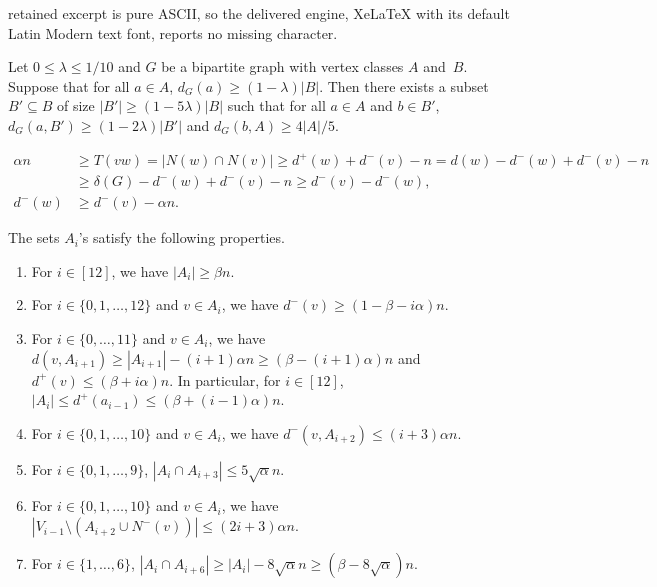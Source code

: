 \documentclass[10pt,a4paper]{amsart}
\begin{document}
retained excerpt is pure ASCII, so the delivered engine, XeLaTeX with its default Latin Modern text font, reports no missing character.
	\begin{proposition}\label{Proposition: A-B set}
		Let $0\leq \lambda\leq 1/{10}$ and $G$ be a bipartite graph with vertex classes $A$ and~$B$. Suppose that for all $a\in A$, $d_G(a)\geq (1-\lambda)|B|$. Then there exists a subset $B'\subseteq B$ of size $|B'|\geq (1-5\lambda)|B|$ such that for all $a\in A$ and $b\in B'$, $d_G(a,B')\geq (1-2\lambda)|B'|$ and $d_G(b,A)\geq 4|A|/5$.
	\end{proposition}

\begin{align}
\alpha n &\ge T(vw) = | N(w)\cap N(v) | \ge d^+(w) + d^-(v) - n 
= d(w) - d^-(w) + d^-(v) - n \nonumber \\
& \ge \delta(G) - d^-(w) + d^-(v) - n 
\ge d^-(v) - d^-(w), \nonumber \\
			d^-(w)& \geq d^-(v)-\alpha n.	\label{eqn:vw}
	\end{align}

		\begin{claim}\label{Claim:A_i}
			The sets $A_i$'s satisfy the following properties.
			\begin{enumerate}[label = {\rm (\roman*)}]
				\item For $i\in [12]$, we have $|A_i|\geq \beta n$.
				\label{itm:C_6:1}
				
				\item For $i\in \{0,1,\dots,12\}$ and $v\in A_i$, we have $d^-(v)\geq (1-\beta-i\alpha)n$.
				\label{itm:C_6:2}
				
				\item For $i\in \{0,\dots,11\}$ and $v\in A_i$, we have $d(v, A_{i+1})\ge |A_{i+1}|-(i+1)\alpha n\geq (\beta -(i+1)\alpha)n$ and $d^+(v)\leq (\beta+i\alpha)n$. In particular, for $i\in [12]$, $|A_i|\leq d^+(a_{i-1})\leq (\beta +(i-1) \alpha)n$.
				\label{itm:C_6:3}
				
				\item For $i\in \{0,1,\dots,10\}$ and $v\in A_i$, we have $d^-(v,A_{i+2})\leq (i+3)\alpha n$.
				\label{itm:C_6:4}
				
				\item For $i\in \{0,1,\dots,9\}$, $|A_i\cap A_{i+3}|\leq 5\sqrt{\alpha} n$.
				\label{itm:C_6:5}
				
				\item For $i\in \{0,1,\dots,10\}$ and $v\in A_i$, we have $|V_{i-1}\setminus\left(A_{i+2}\cup N^-(v)\right)|\leq (2i+3)\alpha n$.
				\label{itm:C_6:6}
				
				\item For $i\in \{1,\dots,6\}$, $|A_i\cap A_{i+6}|\geq |A_i|-8\sqrt{\alpha} n\geq (\beta -8\sqrt{\alpha})n$.
				\label{itm:C_6:7}
			\end{enumerate}
		\end{claim}
\end{document}

